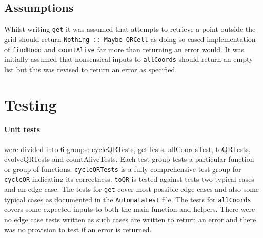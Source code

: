 \documentclass[11pt]{article}
\begin{document}
 \subsection{Assumptions}%
Whilst writing \verb|get| it was assumed that attempts to retrieve a point outside the grid should return \verb|Nothing :: Maybe QRCell| as doing so eased implementation of \verb|findHood| and \verb|countAlive| far more than returning an error would. It was initially assumed that nonsensical inputs to \verb|allCoords| should return an empty list but this was revised to return an error as specified.


\section{Testing}%
\paragraph{Unit tests} were divided into 6 groups: cycleQRTests, getTests, allCoordsTest, toQRTests, evolveQRTests and countAliveTests. Each test group tests a particular function or group of functions. \verb|cycleQRTests| is a fully comprehensive test group for \verb|cycleQR| indicating its correctness. \verb|toQR| is tested against tests two typical cases and an edge case. The tests for \verb|get| cover most possible edge cases and also some typical cases as documented in the \verb|AutomataTest| file. The tests for \verb|allCoords| covers some expected inputs to both the main function and helpers. There were no edge case tests written as such cases are written to return an error and there was no provision to test if an error is returned.\\
\end{document}
